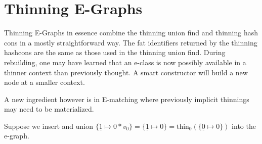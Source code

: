 \documentclass{article}%
\begin{document}
\section{Thinning E-Graphs}




Thinning E-Graphs in essence combine the thinning union find and thinning hash cons in a mostly straightforward way. The fat identifiers returned by the thinning hashcons are the same as those used in the thinning union find. During rebuilding, one may have learned that an e-class is now possibly available in a thinner context than previously thought. A smart constructor will build a new node at a smaller context.

A new ingredient however is in E-matching where previously implicit thinnings may need to be materialized.

Suppose we insert and union $ \{ \underline{1} \mapsto 0 * v_0 \} = \{ \underline{1} \mapsto 0 \} = \text{thin}_0(\{ \underline{0} \mapsto 0 \} )$ into the e-graph. 
\end{document}
